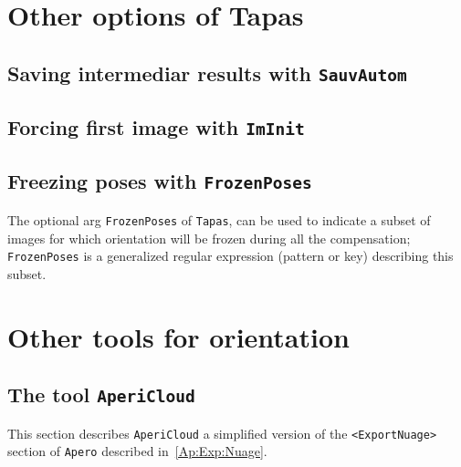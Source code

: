 
\section{Other options of Tapas}

\subsection{Saving intermediar results with {\tt SauvAutom}}

\subsection{Forcing first image with {\tt ImInit}}

\subsection{Freezing poses with  {\tt FrozenPoses}}

The optional arg {\tt FrozenPoses} of {\tt Tapas}, can be used to indicate
a subset of images for which orientation will be frozen during all the
compensation;  {\tt FrozenPoses} is a generalized regular expression  
(pattern or key) describing this subset.




\section{Other tools for orientation}



\subsection{The tool {\tt AperiCloud}}
\label{APERICLOUD}

This section describes {\tt AperiCloud} a simplified version of the
{\tt <ExportNuage>} section of {\tt Apero} described in~\ref{Ap:Exp:Nuage}.


